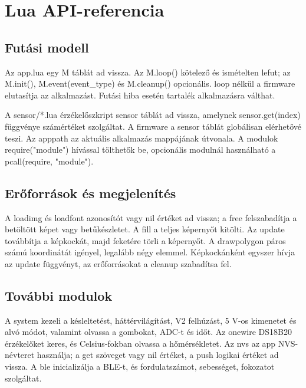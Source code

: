\chapter{Lua API-referencia}
\section{Futási modell}
Az app.lua egy M táblát ad vissza. Az M.loop() kötelező és ismételten lefut; az M.init(), M.event(event\_type) és M.cleanup() opcionális. loop nélkül a firmware elutasítja az alkalmazást. Futási hiba esetén tartalék alkalmazásra válthat.

A sensor/*.lua érzékelőszkript sensor táblát ad vissza, amelynek sensor.get(index) függvénye számértéket szolgáltat. A firmware a sensor táblát globálisan elérhetővé teszi. Az apppath az aktuális alkalmazás mappájának útvonala. A modulok require("module") hívással tölthetők be, opcionális modulnál használható a pcall(require, "module").
\section{Erőforrások és megjelenítés}
A loadimg és loadfont azonosítót vagy nil értéket ad vissza; a free felszabadítja a betöltött képet vagy betűkészletet. A fill a teljes képernyőt kitölti. Az update továbbítja a képkockát, majd feketére törli a képernyőt. A drawpolygon páros számú koordinátát igényel, legalább négy elemmel. Képkockánként egyszer hívja az update függvényt, az erőforrásokat a cleanup szabadítsa fel.
\section{További modulok}
A system kezeli a késleltetést, háttérvilágítást, V2 felhúzást, 5 V-os kimenetet és alvó módot, valamint olvassa a gombokat, ADC-t és időt. Az onewire DS18B20 érzékelőket keres, és Celsius-fokban olvassa a hőmérsékletet. Az nvs az app NVS-névteret használja; a get szöveget vagy nil értéket, a push logikai értéket ad vissza. A ble inicializálja a BLE-t, és fordulatszámot, sebességet, fokozatot szolgáltat.
